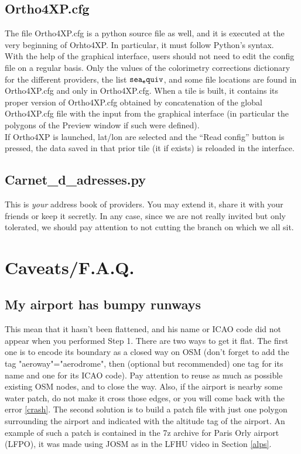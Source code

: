 \documentclass[12pt]{article}
\begin{document}
\subsection{Ortho4XP.cfg}
The file Ortho4XP.cfg is a python source file as well, and it is executed at the very beginning of Orhto4XP. In particular, it must follow Python's syntax.\\
With the help of the graphical interface, users should not need to edit the config file on a regular basis.
Only the values of the colorimetry corrections dictionary for the different providers, the list
${\tt sea_equiv}$, and some file locations are found in Ortho4XP.cfg and only in Ortho4XP.cfg.
When a tile is built, it contains its proper version of Ortho4XP.cfg obtained by concatenation of the global Ortho4XP.cfg file with the input from the graphical interface (in particular the polygons of the Preview window if such were defined).\\
If Ortho4XP is launched, lat/lon are selected and the ``Read config'' button is pressed, the data
saved in that prior tile (it if exists) is reloaded in the interface.

\subsection{Carnet\_d\_adresses.py}
This is {\it your} address book of providers. You may extend it, share it with your friends or keep it secretly. In any case, since we are not really invited but only tolerated, we should pay attention to not cutting the branch on which we all sit.

\section{Caveats/F.A.Q.}
\subsection{My airport has bumpy runways}
This mean that it hasn't been flattened, and his name or ICAO code did not appear when you performed Step 1. There are two ways to get it flat.  The first one is to encode its boundary as a closed way on OSM (don't forget to add the tag "aeroway"="aerodrome", then (optional but recommended) one tag for its name and one for its ICAO code).  Pay attention to reuse as much as possible existing OSM nodes, and to close the way. Also, if the airport is nearby some water patch, do not make it cross those edges, or you will come back with the error \ref{crash}.
The second solution is to build a patch file with just one polygon surrounding the airport and indicated with the altitude tag of the airport.  An example of such a patch is contained in the 7z archive for Paris Orly airport (LFPO), it was made using JOSM as in the LFHU video in Section \ref{alps}.
\end{document}
